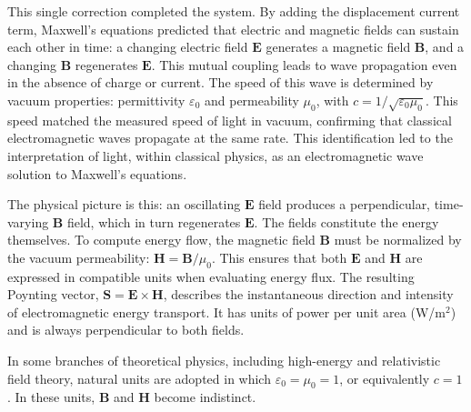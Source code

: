 This single correction completed the system. By adding the displacement current term, Maxwell's equations predicted that electric and magnetic fields can sustain each other in time: a changing electric field $\mathbf{E}$ generates a magnetic field $\mathbf{B}$, and a changing $\mathbf{B}$ regenerates $\mathbf{E}$. This mutual coupling leads to wave propagation even in the absence of charge or current. The speed of this wave is determined by vacuum properties: permittivity $\varepsilon_0$ and permeability $\mu_0$, with $c = 1/\sqrt{\varepsilon_0 \mu_0}$. This speed matched the measured speed of light in vacuum, confirming that classical electromagnetic waves propagate at the same rate. This identification led to the interpretation of light, within classical physics, as an electromagnetic wave solution to Maxwell's equations.

The physical picture is this: an oscillating $\mathbf{E}$ field produces a perpendicular, time-varying $\mathbf{B}$ field, which in turn regenerates $\mathbf{E}$. The fields constitute the energy themselves. To compute energy flow, the magnetic field $\mathbf{B}$ must be normalized by the vacuum permeability: $\mathbf{H} = \mathbf{B} / \mu_0$. This ensures that both $\mathbf{E}$ and $\mathbf{H}$ are expressed in compatible units when evaluating energy flux. The resulting Poynting vector, $\mathbf{S} = \mathbf{E} \times \mathbf{H}$, describes the instantaneous direction and intensity of electromagnetic energy transport. It has units of power per unit area (W/m$^2$) and is always perpendicular to both fields.

In some branches of theoretical physics, including high-energy and relativistic field theory, natural units are adopted in which $\varepsilon_0 = \mu_0 = 1$, or equivalently $c = 1$. In these units, $\mathbf{B}$ and $\mathbf{H}$ become indistinct.

